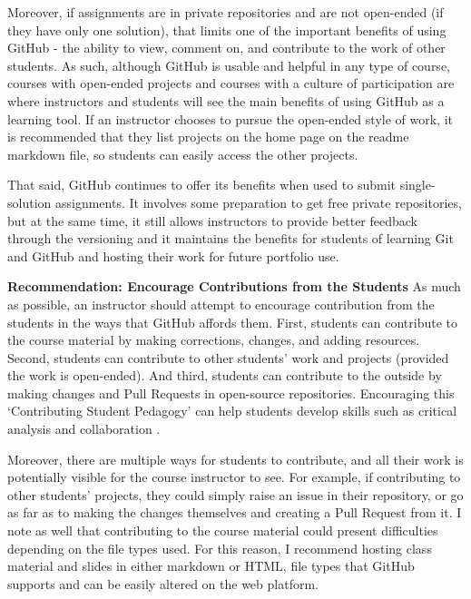 Moreover, if assignments are in private repositories and are not open-ended (if they have only one solution), that limits one of the important benefits of using GitHub - the ability to view, comment on, and contribute to the work of other students. As such, although GitHub is usable and helpful in any type of course, courses with open-ended projects and courses with a culture of participation are where instructors and students will see the main benefits of using GitHub as a learning tool. If an instructor chooses to pursue the open-ended style of work, it is recommended that they list projects on the home page on the readme markdown file, so students can easily access the other projects.

That said, GitHub continues to offer its benefits when used to submit single-solution assignments. It involves some preparation to get free private repositories, but at the same time, it still allows instructors to provide better feedback through the versioning and it maintains the benefits for students of learning Git and GitHub and hosting their work for future portfolio use.

\textbf{Recommendation: Encourage Contributions from the Students}
As much as possible, an instructor should attempt to encourage contribution from the students in the ways that GitHub affords them. First, students can contribute to the course material by making corrections, changes, and adding resources. Second, students can contribute to other students' work and projects (provided the work is open-ended). And third, students can contribute to the outside by making changes and Pull Requests in open-source repositories. Encouraging this `Contributing Student Pedagogy' can help students develop skills such as critical analysis and collaboration \cite{falkner2012supporting}.

Moreover, there are multiple ways for students to contribute, and all their work is potentially visible for the course instructor to see. For example, if contributing to other students' projects, they could simply raise an issue in their repository, or go as far as to making the changes themselves and creating a Pull Request from it. I note as well that contributing to the course material could present difficulties depending on the file types used. For this reason, I recommend hosting class material and slides in either markdown or HTML, file types that GitHub supports and can be easily altered on the web platform.

